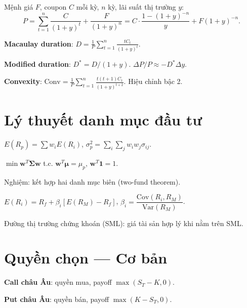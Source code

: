 \documentclass[12pt,a4paper]{article}
\begin{document}
\begin{dinhnghia}[title={Trái phiếu coupon}]
  Mệnh giá $F$, coupon $C$ mỗi kỳ, $n$ kỳ, lãi suất thị trường $y$:
  \[
    P = \sum_{t=1}^{n}\frac{C}{(1+y)^t} + \frac{F}{(1+y)^n} = C\cdot\frac{1-(1+y)^{-n}}{y} + F(1+y)^{-n}.
  \]
\end{dinhnghia}

\begin{dinhnghia}[title={Duration và Convexity}]
  \textbf{Macaulay duration}: $D = \frac{1}{P}\sum_{t=1}^{n}\frac{tC_t}{(1+y)^t}$.

  \textbf{Modified duration}: $D^* = D/(1+y)$. $\Delta P/P \approx -D^*\Delta y$.

  \textbf{Convexity}: $\text{Conv} = \frac{1}{P}\sum_{t=1}^{n}\frac{t(t+1)C_t}{(1+y)^{t+2}}$. Hiệu chỉnh bậc 2.
\end{dinhnghia}

\section{Lý thuyết danh mục đầu tư}

\begin{dinhnghia}[title={Suất sinh lợi và rủi ro}]
  $E(R_p) = \sum w_i E(R_i)$, $\sigma_p^2 = \sum_i\sum_j w_i w_j \sigma_{ij}$.
\end{dinhnghia}

\begin{dinhly}[title={Biên hiệu quả Markowitz}]
  $\min \mathbf{w}^T\boldsymbol{\Sigma}\mathbf{w}$ t.c. $\mathbf{w}^T\boldsymbol{\mu} = \mu_p$, $\mathbf{w}^T\mathbf{1} = 1$.

  Nghiệm: kết hợp hai danh mục biên (two-fund theorem).
\end{dinhly}

\begin{dinhly}[title={CAPM (Capital Asset Pricing Model)}]
  $E(R_i) = R_f + \beta_i[E(R_M) - R_f]$, $\beta_i = \dfrac{\text{Cov}(R_i, R_M)}{\text{Var}(R_M)}$.

  Đường thị trường chứng khoán (SML): giá tài sản hợp lý khi nằm trên SML.
\end{dinhly}

\section{Quyền chọn --- Cơ bản}

\begin{dinhnghia}[title={Call và Put}]
  \textbf{Call châu Âu}: quyền mua, payoff $\max(S_T - K, 0)$.

  \textbf{Put châu Âu}: quyền bán, payoff $\max(K - S_T, 0)$.
\end{dinhnghia}
\end{document}
